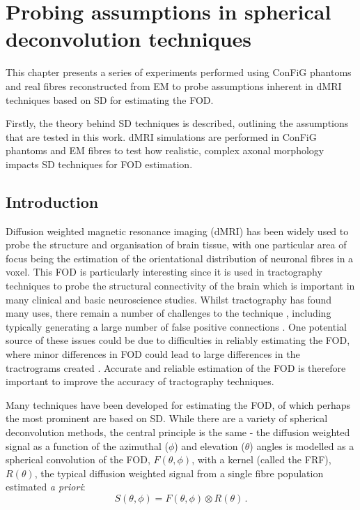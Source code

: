 \chapter{Probing assumptions in spherical deconvolution techniques}
\label{chap:frf_experiment}

\chaptertoc{}

\begin{chapterabstract}
This chapter presents a series of experiments performed using \acs{ConFiG} phantoms and real fibres reconstructed from \ac{EM} to probe assumptions inherent in \ac{dMRI} techniques based on \ac{SD} for estimating the \ac{FOD}.

Firstly, the theory behind \ac{SD} techniques is described, outlining the assumptions that are tested in this work. \ac{dMRI} simulations are performed in \acs{ConFiG} phantoms and \ac{EM} fibres to test how realistic, complex axonal morphology impacts \ac{SD} techniques for \ac{FOD} estimation. 
\end{chapterabstract}


\section{Introduction}
\label{sec:frf_introduction}
Diffusion weighted magnetic resonance imaging (dMRI) has been widely used to probe the structure and organisation of brain tissue, with one particular area of focus being the estimation of the orientational distribution of neuronal fibres in a voxel. This \ac{FOD} is particularly interesting since it is used in tractography techniques to probe the structural connectivity of the brain which is important in many clinical and basic neuroscience studies\cite{DellAcqua2019,Johansen-Berg2006,Catani2013}.
Whilst tractography has found many uses, there remain a number of challenges to the technique \cite{Jbabdi2011,Schilling2019b}, including typically generating a large number of false positive connections \cite{Maier-Hein2017}.
One potential source of these issues could be due to difficulties in reliably estimating the \ac{FOD}, where minor differences in \ac{FOD} could lead to large differences in the tractrograms created \cite{Schilling2019b}.
Accurate and reliable estimation of the \ac{FOD} is therefore important to improve the accuracy of tractography techniques.


Many techniques have been developed for estimating the \acl{FOD}, of which perhaps the most prominent are based on \acf{SD}. While there are a variety of spherical deconvolution methods, the central principle is the same - the diffusion weighted signal as a function of the azimuthal ($\phi$) and elevation ($\theta$) angles is modelled as a spherical convolution of the \ac{FOD}, $F(\theta,\phi)$, with a kernel (called the \ac{FRF}), $R(\theta)$, the typical diffusion weighted signal from a single fibre population estimated \emph{a priori}:
\begin{equation}
  S(\theta, \phi) = F(\theta, \phi) \otimes R(\theta) \,.
  \label{eq:spherical_conv}
\end{equation}

